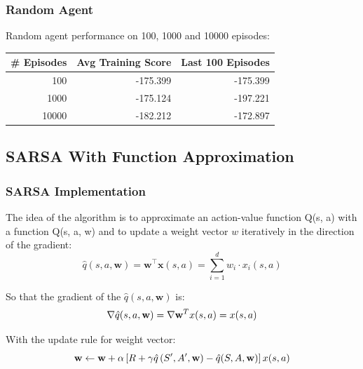 \documentclass{beamer}
\begin{document}
\begin{frame}
\frametitle{Random Agent}
Random agent performance on 100, 1000 and 10000 episodes:

\begin{table}[H]
	\centering
	\begin{tabular}{|r|r|r|}
		\hline
		
		\multicolumn{1}{|l|}{\# Episodes} & \multicolumn{1}{l|}{Avg Training Score} & \multicolumn{1}{l|}{Last 100 Episodes} \\
		\hline
		100   & -175.399 & -175.399 \\
		\hline
		1000  & -175.124 & -197.221 \\
		\hline
		10000 & -182.212 & -172.897 \\
		\hline
	\end{tabular}%
	\label{tab:addlabel}%
\end{table}%



\end{frame}




\subsection{SARSA With Function Approximation}

\begin{frame}
\frametitle{SARSA Implementation}
The idea of the
algorithm is to approximate an action-value function Q(s, a) 
with a function Q(s, a, w) and to update a weight vector $w$
iteratively in the direction of the gradient:
\begin{equation}
\hat{q}(s, a, \mathbf{w}) = \mathbf{w}^{\top} \mathbf{x}(s, a)=\sum_{i=1}^{d} w_{i} \cdot x_{i}(s, a) 
\end{equation}

So that the gradient of the $\hat{q}(s, a, \mathbf{w})$ is:
\begin{equation}
\nabla \hat q(s,a,{\bf{w}}) = \nabla {\bf{w}}_{}^Tx(s,a) = x(s,a)
\end{equation}

With the update rule for weight vector:
\begin{equation}
{\bf{w}} \leftarrow {\bf{w}} + \alpha \left[ {R + \gamma \hat q\left( {{S^\prime },{A^\prime },{\bf{w}}} \right) - \hat q(S,A,{\bf{w}})} \right]x(s,a)
\end{equation}
\end{frame}
\end{document}
